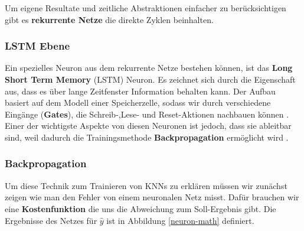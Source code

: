             \noindent
            Um eigene Resultate und zeitliche Abstraktionen einfacher zu berücksichtigen gibt es \textbf{rekurrente Netze} die direkte Zyklen beinhalten.

            \subsubsection*{LSTM Ebene}
                Ein spezielles Neuron aus dem rekurrente Netze bestehen können, ist das \textbf{Long Short Term Memory} (LSTM) Neuron\cite{lstm}. Es zeichnet sich durch die Eigenschaft aus, dass es über lange Zeitfenster Information behalten kann. Der Aufbau basiert auf dem Modell einer Speicherzelle, sodass wir durch verschiedene Eingänge (\textbf{Gates}), die Schreib-,Lese- und Reset-Aktionen nachbauen können \cite{lstm-new}. Einer der wichtigste Aspekte von diesen Neuronen ist jedoch, dass sie ableitbar sind, weil dadurch die Trainingsmethode \textbf{Backpropagation} ermöglicht wird \cite{backprop}.

\newpage
            \subsubsection*{Backpropagation}
                Um diese Technik zum Trainieren von KNNs zu erklären müssen wir zunächst zeigen wie man den Fehler von einem neuronalen Netz misst. Dafür brauchen wir eine \textbf{Kostenfunktion} die uns die Abweichung zum Soll-Ergebnis gibt. Die Ergebnisse des Netzes für $\widehat{y}$ ist in Abbildung \ref{neuron-math} definiert.

